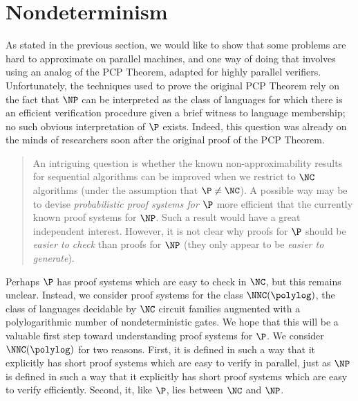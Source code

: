 \documentclass{article}
\begin{document}
\section{Nondeterminism}







%



As stated in the previous section, we would like to show that some problems are hard to approximate on parallel machines, and one way of doing that involves using an analog of the PCP Theorem, adapted for highly parallel verifiers.
Unfortunately, the techniques used to prove the original PCP Theorem rely on the fact that $\NP$ can be interpreted as the class of languages for which there is an efficient verification procedure given a brief witness to language membership; no such obvious interpretation of $\P$ exists.
Indeed, this question was already on the minds of researchers soon after the original proof of the PCP Theorem.
\blockquote[{\autocite{trevisan98}}]{
  An intriguing question is whether the known non-approximability results for sequential algorithms can be improved when we restrict to $\NC$ algorithms (under the assumption that $\P \neq \NC$).
  A possible way may be to devise \emph{probabilistic proof systems for $\P$} more efficient that the currently known proof systems for $\NP$.
  Such a result would have a great independent interest.
  However, it is not clear why proofs for $\P$ should be \emph{easier to check} than proofs for $\NP$ (they only appear to be \emph{easier to generate}).
}
Perhaps $\P$ has proof systems which are easy to check in $\NC$, but this remains unclear.
Instead, we consider proof systems for the class $\NNC(\polylog)$, the class of languages decidable by $\NC$ circuit families augmented with a polylogarithmic number of nondeterministic gates.
We hope that this will be a valuable first step toward understanding proof systems for $\P$.
We consider $\NNC(\polylog)$ for two reasons.
First, it is defined in such a way that it explicitly has short proof systems which are easy to verify in parallel, just as $\NP$ is defined in such a way that it explicitly has short proof systems which are easy to verify efficiently.
Second, it, like $\P$, lies between $\NC$ and $\NP$.
\end{document}
